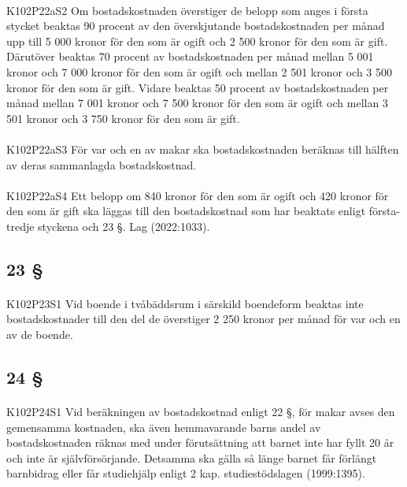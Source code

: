 \documentclass[a4paper,notitlepage,openany,10pt]{book}
\begin{document}
\paragraph*{}
{\tiny K102P22aS2}
Om bostadskostnaden överstiger de belopp som anges i första stycket beaktas 90 procent av den överskjutande bostadskostnaden per månad upp till 5 000 kronor för den som är ogift och 2 500 kronor för den som är gift. Därutöver beaktas 70 procent av bostadskostnaden per månad mellan 5 001 kronor och 7 000 kronor för den som är ogift och mellan 2 501 kronor och 3 500 kronor för den som är gift. Vidare beaktas 50 procent av bostadskostnaden per månad mellan 7 001 kronor och 7 500 kronor för den som är ogift och mellan 3 501 kronor och 3 750 kronor för den som är gift.
\paragraph*{}
{\tiny K102P22aS3}
För var och en av makar ska bostadskostnaden beräknas till hälften av deras sammanlagda bostadskostnad.
\paragraph*{}
{\tiny K102P22aS4}
Ett belopp om 840 kronor för den som är ogift och 420 kronor för den som är gift ska läggas till den bostadskostnad som har beaktats enligt första-tredje styckena och 23 §.
Lag (2022:1033).
\subsection*{23 §}
\paragraph*{}
{\tiny K102P23S1}
Vid boende i tvåbäddsrum i särskild boendeform beaktas inte bostadskostnader till den del de överstiger 2 250 kronor per månad för var och en av de boende.
\subsection*{24 §}
\paragraph*{}
{\tiny K102P24S1}
Vid beräkningen av bostadskostnad enligt 22 §, för makar avses den gemensamma kostnaden, ska även hemmavarande barns andel av bostadskostnaden räknas med under förutsättning att barnet inte har fyllt 20 år och inte är självförsörjande.
Detsamma ska gälla så länge barnet får förlängt barnbidrag eller får studiehjälp enligt 2 kap. studiestödslagen (1999:1395).
\end{document}
